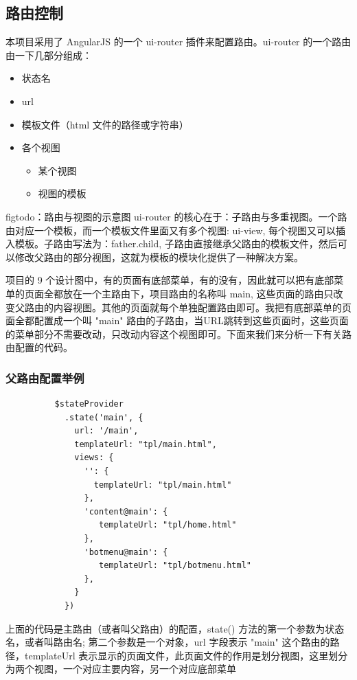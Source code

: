 \documentclass[UTF8]{ctexbook}
\begin{document}
    \subsection{路由控制}
      \label{subsec:路由控制}
      本项目采用了 AngularJS 的一个 ui-router 插件来配置路由。ui-router 的一个路由由一下几部分组成：
      \begin{itemize}
        \item 状态名
        \item url
        \item 模板文件（html 文件的路径或字符串）
        \item 各个视图
        \begin{itemize}
          \item 某个视图
          \item 视图的模板
        \end{itemize}
      \end{itemize}
      figtodo：路由与视图的示意图
      ui-router 的核心在于：子路由与多重视图。一个路由对应一个模板，而一个模板文件里面又有多个视图: ui-view, 每个视图又可以插入模板。子路由写法为：father.child, 子路由直接继承父路由的模板文件，然后可以修改父路由的部分视图，这就为模板的模块化提供了一种解决方案。
      \par
      项目的 9 个设计图中，有的页面有底部菜单，有的没有，因此就可以把有底部菜单的页面全都放在一个主路由下，项目路由的名称叫 main, 这些页面的路由只改变父路由的内容视图。其他的页面就每个单独配置路由即可。我把有底部菜单的页面全都配置成一个叫 "main" 路由的子路由，当URL跳转到这些页面时，这些页面的菜单部分不需要改动，只改动内容这个视图即可。下面来我们来分析一下有关路由配置的代码。
      \subsubsection{父路由配置举例}
        \label{subsubsec:父路由配置举例}

        \begin{lstlisting}
          $stateProvider
            .state('main', {
              url: '/main',
              templateUrl: "tpl/main.html",
              views: {
                '': {
                  templateUrl: "tpl/main.html"
                },
                'content@main': {
                   templateUrl: "tpl/home.html"
                },
                'botmenu@main': {
                   templateUrl: "tpl/botmenu.html"
                },
              }
            })
        \end{lstlisting}
        上面的代码是主路由（或者叫父路由）的配置，state() 方法的第一个参数为状态名，或者叫路由名; 第二个参数是一个对象，url 字段表示 "main" 这个路由的路径，templateUrl 表示显示的页面文件，此页面文件的作用是划分视图，这里划分为两个视图，一个对应主要内容，另一个对应底部菜单
\end{document}
